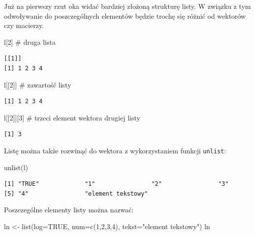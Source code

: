 \documentclass[
  letterpaper,
  DIV=11,
  numbers=noendperiod]{scrreprt}
\newenvironment{Shaded}{\begin{snugshade}}{\end{snugshade}}
\newcommand{\AttributeTok}[1]{\textcolor[rgb]{0.40,0.45,0.13}{#1}}
\newcommand{\CommentTok}[1]{\textcolor[rgb]{0.37,0.37,0.37}{#1}}
\newcommand{\ConstantTok}[1]{\textcolor[rgb]{0.56,0.35,0.01}{#1}}
\newcommand{\DecValTok}[1]{\textcolor[rgb]{0.68,0.00,0.00}{#1}}
\newcommand{\FunctionTok}[1]{\textcolor[rgb]{0.28,0.35,0.67}{#1}}
\newcommand{\NormalTok}[1]{\textcolor[rgb]{0.00,0.23,0.31}{#1}}
\newcommand{\OtherTok}[1]{\textcolor[rgb]{0.00,0.23,0.31}{#1}}
\newcommand{\StringTok}[1]{\textcolor[rgb]{0.13,0.47,0.30}{#1}}
\begin{document}
Już na pierwszy rzut oka widać bardziej złożoną strukturę listy. W
związku z tym odwoływanie do poszczególnych elementów będzie trochę się
różnić od wektorów czy macierzy.

\begin{Shaded}
\begin{Highlighting}[]
\NormalTok{l[}\DecValTok{2}\NormalTok{] }\CommentTok{\# druga lista}
\end{Highlighting}
\end{Shaded}

\begin{verbatim}
[[1]]
[1] 1 2 3 4
\end{verbatim}

\begin{Shaded}
\begin{Highlighting}[]
\NormalTok{l[[}\DecValTok{2}\NormalTok{]] }\CommentTok{\# zawartość listy}
\end{Highlighting}
\end{Shaded}

\begin{verbatim}
[1] 1 2 3 4
\end{verbatim}

\begin{Shaded}
\begin{Highlighting}[]
\NormalTok{l[[}\DecValTok{2}\NormalTok{]][}\DecValTok{3}\NormalTok{] }\CommentTok{\# trzeci element wektora drugiej listy}
\end{Highlighting}
\end{Shaded}

\begin{verbatim}
[1] 3
\end{verbatim}

Listę można także rozwinąć do wektora z wykorzystaniem funkcji
\texttt{unlist}:

\begin{Shaded}
\begin{Highlighting}[]
\FunctionTok{unlist}\NormalTok{(l)}
\end{Highlighting}
\end{Shaded}

\begin{verbatim}
[1] "TRUE"             "1"                "2"                "3"               
[5] "4"                "element tekstowy"
\end{verbatim}

Poszczególne elementy listy można nazwać:

\begin{Shaded}
\begin{Highlighting}[]
\NormalTok{ln }\OtherTok{\textless{}{-}} \FunctionTok{list}\NormalTok{(}\AttributeTok{log=}\ConstantTok{TRUE}\NormalTok{, }\AttributeTok{num=}\FunctionTok{c}\NormalTok{(}\DecValTok{1}\NormalTok{,}\DecValTok{2}\NormalTok{,}\DecValTok{3}\NormalTok{,}\DecValTok{4}\NormalTok{), }\AttributeTok{tekst=}\StringTok{"element tekstowy"}\NormalTok{)}
\NormalTok{ln}
\end{Highlighting}
\end{Shaded}
\end{document}
